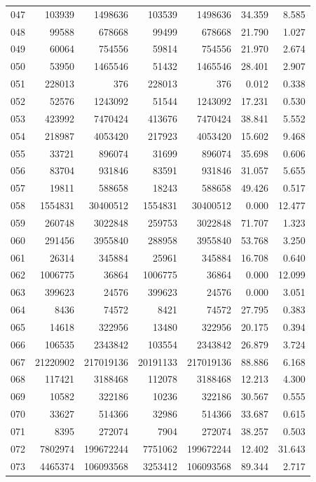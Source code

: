 \begin{longtable}{lrrrrrr}
047 & 103939 & 1498636 & 103539 & 1498636 & 34.359 & 8.585\\
048 & 99588 & 678668 & 99499 & 678668 & 21.790 & 1.027\\
049 & 60064 & 754556 & 59814 & 754556 & 21.970 & 2.674\\
050 & 53950 & 1465546 & 51432 & 1465546 & 28.401 & 2.907\\
051 & 228013 & 376 & 228013 & 376 & 0.012 & 0.338\\
052 & 52576 & 1243092 & 51544 & 1243092 & 17.231 & 0.530\\
053 & 423992 & 7470424 & 413676 & 7470424 & 38.841 & 5.552\\
054 & 218987 & 4053420 & 217923 & 4053420 & 15.602 & 9.468\\
055 & 33721 & 896074 & 31699 & 896074 & 35.698 & 0.606\\
056 & 83704 & 931846 & 83591 & 931846 & 31.057 & 5.655\\
057 & 19811 & 588658 & 18243 & 588658 & 49.426 & 0.517\\
058 & 1554831 & 30400512 & 1554831 & 30400512 & 0.000 & 12.477\\
059 & 260748 & 3022848 & 259753 & 3022848 & 71.707 & 1.323\\
060 & 291456 & 3955840 & 288958 & 3955840 & 53.768 & 3.250\\
061 & 26314 & 345884 & 25961 & 345884 & 16.708 & 0.640\\
062 & 1006775 & 36864 & 1006775 & 36864 & 0.000 & 12.099\\
063 & 399623 & 24576 & 399623 & 24576 & 0.000 & 3.051\\
064 & 8436 & 74572 & 8421 & 74572 & 27.795 & 0.383\\
065 & 14618 & 322956 & 13480 & 322956 & 20.175 & 0.394\\
066 & 106535 & 2343842 & 103554 & 2343842 & 26.879 & 3.724\\
067 & 21220902 & 217019136 & 20191133 & 217019136 & 88.886 & 6.168\\
068 & 117421 & 3188468 & 112078 & 3188468 & 12.213 & 4.300\\
069 & 10582 & 322186 & 10236 & 322186 & 30.567 & 0.555\\
070 & 33627 & 514366 & 32986 & 514366 & 33.687 & 0.615\\
071 & 8395 & 272074 & 7904 & 272074 & 38.257 & 0.503\\
072 & 7802974 & 199672244 & 7751062 & 199672244 & 12.402 & 31.643\\
073 & 4465374 & 106093568 & 3253412 & 106093568 & 89.344 & 2.717\\

\end{longtable}
